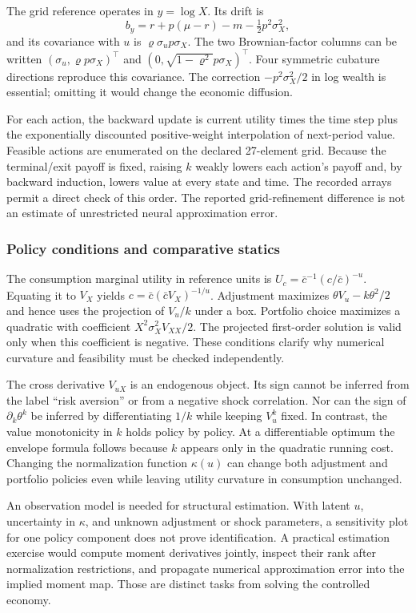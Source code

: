 \documentclass[ecta,nameyear,draft]{econsocart}
\theoremstyle{definition}
\theoremstyle{remark}
\begin{document}
The grid reference operates in $y=\log X$. Its drift is
\[
 b_y=r+p(\mu-r)-m-\tfrac12p^2\sigma_X^2,
\]
and its covariance with $u$ is $\varrho\sigma_u p\sigma_X$. The two Brownian-factor columns can be written $(\sigma_u,\varrho p\sigma_X)^\top$ and $(0,\sqrt{1-\varrho^2}p\sigma_X)^\top$. Four symmetric cubature directions reproduce this covariance. The correction $-p^2\sigma_X^2/2$ in log wealth is essential; omitting it would change the economic diffusion.

For each action, the backward update is current utility times the time step plus the exponentially discounted positive-weight interpolation of next-period value. Feasible actions are enumerated on the declared 27-element grid. Because the terminal/exit payoff is fixed, raising $k$ weakly lowers each action's payoff and, by backward induction, lowers value at every state and time. The recorded arrays permit a direct check of this order. The reported grid-refinement difference is not an estimate of unrestricted neural approximation error.

\subsubsection{Policy conditions and comparative statics}
The consumption marginal utility in reference units is $U_c=\bar c^{-1}(c/\bar c)^{-u}$. Equating it to $V_X$ yields $c=\bar c(\bar cV_X)^{-1/u}$. Adjustment maximizes $\theta V_u-k\theta^2/2$ and hence uses the projection of $V_u/k$ under a box. Portfolio choice maximizes a quadratic with coefficient $X^2\sigma_X^2V_{XX}/2$. The projected first-order solution is valid only when this coefficient is negative. These conditions clarify why numerical curvature and feasibility must be checked independently.

The cross derivative $V_{uX}$ is an endogenous object. Its sign cannot be inferred from the label ``risk aversion'' or from a negative shock correlation. Nor can the sign of $\partial_k\theta^k$ be inferred by differentiating $1/k$ while keeping $V_u^k$ fixed. In contrast, the value monotonicity in $k$ holds policy by policy. At a differentiable optimum the envelope formula follows because $k$ appears only in the quadratic running cost. Changing the normalization function $\kappa(u)$ can change both adjustment and portfolio policies even while leaving utility curvature in consumption unchanged.

An observation model is needed for structural estimation. With latent $u$, uncertainty in $\kappa$, and unknown adjustment or shock parameters, a sensitivity plot for one policy component does not prove identification. A practical estimation exercise would compute moment derivatives jointly, inspect their rank after normalization restrictions, and propagate numerical approximation error into the implied moment map. Those are distinct tasks from solving the controlled economy.
\end{document}
